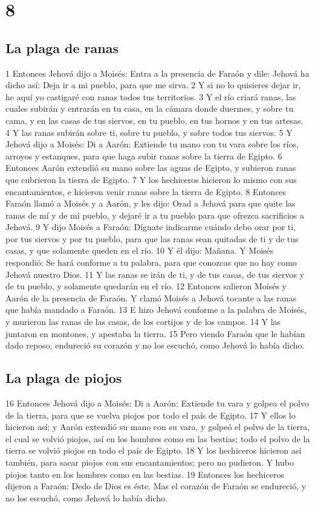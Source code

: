 \chapter{8}

\section{La plaga de ranas}
1 Entonces Jehová dijo a Moisés: Entra a la presencia de Faraón y dile: Jehová ha dicho así: Deja ir a mi pueblo, para que me sirva.
2 Y si no lo quisieres dejar ir, he aquí yo castigaré con ranas todos tus territorios.
3 Y el río criará ranas, las cuales subirán y entrarán en tu casa, en la cámara donde duermes, y sobre tu cama, y en las casas de tus siervos, en tu pueblo, en tus hornos y en tus artesas.
4 Y las ranas subirán sobre ti, sobre tu pueblo, y sobre todos tus siervos.
5 Y Jehová dijo a Moisés: Di a Aarón: Extiende tu mano con tu vara sobre los ríos, arroyos y estanques, para que haga subir ranas sobre la tierra de Egipto.
6 Entonces Aarón extendió su mano sobre las aguas de Egipto, y subieron ranas que cubrieron la tierra de Egipto.
7 Y los hechiceros hicieron lo mismo con sus encantamientos, e hicieron venir ranas sobre la tierra de Egipto.
8 Entonces Faraón llamó a Moisés y a Aarón, y les dijo: Orad a Jehová para que quite las ranas de mí y de mi pueblo, y dejaré ir a tu pueblo para que ofrezca sacrificios a Jehová.
9 Y dijo Moisés a Faraón: Dígnate indicarme cuándo debo orar por ti, por tus siervos y por tu pueblo, para que las ranas sean quitadas de ti y de tus casas, y que solamente queden en el río.
10 Y él dijo: Mañana. Y Moisés respondió: Se hará conforme a tu palabra, para que conozcas que no hay como Jehová nuestro Dios.
11 Y las ranas se irán de ti, y de tus casas, de tus siervos y de tu pueblo, y solamente quedarán en el río.
12 Entonces salieron Moisés y Aarón de la presencia de Faraón. Y clamó Moisés a Jehová tocante a las ranas que había mandado a Faraón.
13 E hizo Jehová conforme a la palabra de Moisés, y murieron las ranas de las casas, de los cortijos y de los campos.
14 Y las juntaron en montones, y apestaba la tierra.
15 Pero viendo Faraón que le habían dado reposo, endureció su corazón y no los escuchó, como Jehová lo había dicho.

\section{La plaga de piojos}
16 Entonces Jehová dijo a Moisés: Di a Aarón: Extiende tu vara y golpea el polvo de la tierra, para que se vuelva piojos por todo el país de Egipto.
17 Y ellos lo hicieron así; y Aarón extendió su mano con su vara, y golpeó el polvo de la tierra, el cual se volvió piojos, así en los hombres como en las bestias; todo el polvo de la tierra se volvió piojos en todo el país de Egipto.
18 Y los hechiceros hicieron así también, para sacar piojos con sus encantamientos; pero no pudieron. Y hubo piojos tanto en los hombres como en las bestias.
19 Entonces los hechiceros dijeron a Faraón: Dedo de Dios es éste. Mas el corazón de Faraón se endureció, y no los escuchó, como Jehová lo había dicho.

